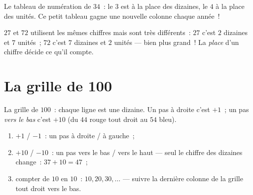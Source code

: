 \begin{omfigure}

{\small Le tableau de numération de $34$~: le $3$ est à la place
des dizaines, le $4$ à la place des unités. Ce petit tableau
gagne une nouvelle colonne chaque année~!}
\end{omfigure}

\begin{example}\label{ex:g1:tens:place}
$27$ et $72$ utilisent les mêmes chiffres mais sont très
différents~: $27$ c'est $2$ dizaines et $7$ unités~; $72$ c'est
$7$ dizaines et $2$ unités --- bien plus grand~! La \emph{place}
d'un chiffre décide ce qu'il compte.
\end{example}

\section{La grille de 100}

\begin{omfigure}

{\small La grille de $100$~: chaque ligne est une dizaine. Un pas à
droite c'est $+1$~; un pas \emph{vers le bas} c'est $+10$ (du $44$
rouge tout droit au $54$ bleu).}
\end{omfigure}

\begin{method}\label{met:g1:tens:grid}
\begin{enumerate}
  \item $+1$ / $-1$~: un pas à droite / à gauche~;
  \item $+10$ / $-10$~: un pas vers le bas / vers le haut --- seul le
        chiffre des dizaines change~: $37 + 10 = 47$~;
  \item compter de $10$ en $10$~: $10, 20, 30, \dots$ --- suivre la
        dernière colonne de la grille tout droit vers le bas.
\end{enumerate}
\end{method}

